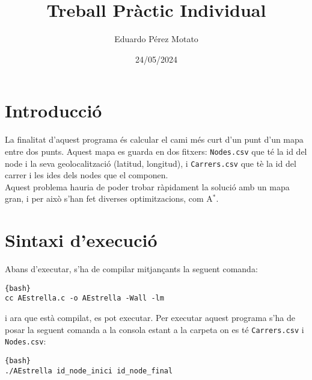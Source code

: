 \documentclass[a4paper, 12pt]{article}
\title{Treball Pràctic Individual}
\author{Eduardo Pérez Motato}
\date{24/05/2024}
\begin{document}
    \makeheader

    \section{Introducció}
    La finalitat d'aquest programa és calcular el cami més curt d'un punt d'un mapa entre dos punts.
    Aquest mapa es guarda en dos fitxers: \verb|Nodes.csv| que té la id del node i la seva
    geolocalització (latitud, longitud), i \verb|Carrers.csv| que tè la id del carrer i les ides
    dels nodes que el componen.\\
    Aquest problema hauria de poder trobar ràpidament la solució amb un mapa gran, i per això s'han
    fet diverses optimitzacions, com A$^*$. 
    \section{Sintaxi d'execució}
    Abans d'executar, s'ha de compilar mitjançants la seguent comanda:
    \begin{lstlisting}{bash}
cc AEstrella.c -o AEstrella -Wall -lm
    \end{lstlisting}
    i ara que està compilat, es pot executar.
    Per executar aquest programa s'ha de posar la seguent comanda a la consola estant a la carpeta
    on es té \verb|Carrers.csv| i \verb|Nodes.csv|:
    \begin{lstlisting}{bash}
./AEstrella id_node_inici id_node_final
    \end{lstlisting}
\end{document}

